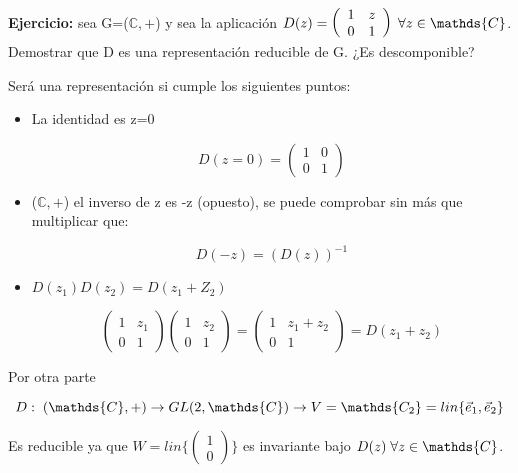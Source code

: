 \documentclass{article}
\begin{document}
    \textbf{Ejercicio:} sea G=($\mathds{C},+$) y sea la aplicación $D(z)=\left ( \begin{array}{cc}
        1 & z \\
        0 & 1
    \end{array} \right ) \hspace{0.1cm} \forall z\in \mathds{C}$. Demostrar que D es una representación reducible de G. ¿Es descomponible?

    \bigskip
    Será una representación si cumple los siguientes puntos:

    \begin{itemize}
        \item La identidad es z=0

        $$D(z=0)=\left ( \begin{array}{cc}
            1 &  0\\
            0 & 1
        \end{array} \right )$$

        \item  ($\mathds{C},+$) el inverso de z es -z (opuesto), se puede comprobar sin más que multiplicar que:

        $$D(-z)=(D(z))^{-1}$$

        \item $D(z_1)D(z_2)=D(z_1+Z_2)$

        $$\left ( \begin{array}{cc}
            1 & z_1 \\
            0 & 1
        \end{array}\right)\left ( \begin{array}{cc}
            1 & z_2 \\
            0 & 1
        \end{array}\right)=\left ( \begin{array}{cc}
            1 & z_1 +z_2 \\
            0 & 1
        \end{array}\right)=D(z_1+z_2)$$
    \end{itemize}

    Por otra parte

    $$D: \hspace{0.1cm} (\mathds{C},+)\to GL(2, \mathds{C}) \to V=\mathds{C_2}=lin \lbrace \Vec{e}_1,\Vec{e}_2\rbrace$$

    Es reducible ya que $W= lin \lbrace \left ( \begin{array}{c}
         1  \\
         0
    \end{array}\right) \rbrace$ es invariante bajo $D(z)\hspace{0.1cm} \forall z \in \mathds{C}$.
\end{document}
